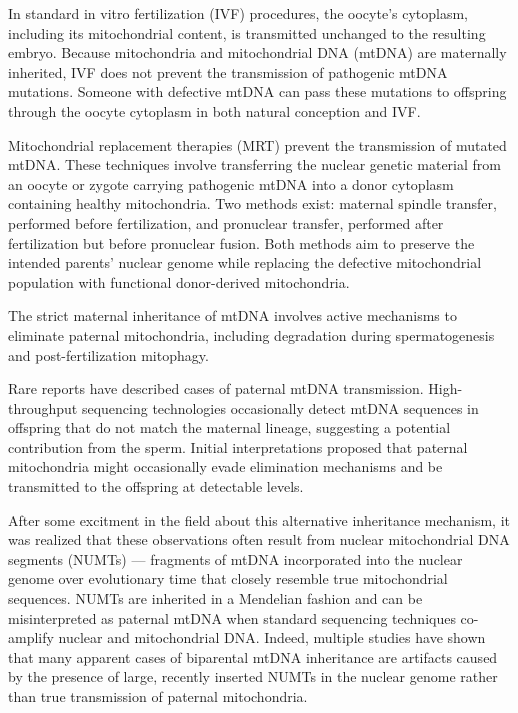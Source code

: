 In standard in vitro fertilization (IVF) procedures, the oocyte’s cytoplasm, including its mitochondrial content, is transmitted unchanged to the resulting embryo. Because mitochondria and mitochondrial DNA (mtDNA) are maternally inherited, IVF does not prevent the transmission of pathogenic mtDNA mutations. Someone with defective mtDNA can pass these mutations to offspring through the oocyte cytoplasm in both natural conception and IVF.

Mitochondrial replacement therapies (MRT) prevent the transmission of mutated mtDNA. These techniques involve transferring the nuclear genetic material from an oocyte or zygote carrying pathogenic mtDNA into a donor cytoplasm containing healthy mitochondria. Two methods exist: maternal spindle transfer, performed before fertilization, and pronuclear transfer, performed after fertilization but before pronuclear fusion. Both methods aim to preserve the intended parents' nuclear genome while replacing the defective mitochondrial population with functional donor-derived mitochondria.

The strict maternal inheritance of mtDNA involves active mechanisms to eliminate paternal mitochondria, including degradation during spermatogenesis and post-fertilization mitophagy.

Rare reports have described cases of paternal mtDNA transmission. High-throughput sequencing technologies occasionally detect mtDNA sequences in offspring that do not match the maternal lineage, suggesting a potential contribution from the sperm. Initial interpretations proposed that paternal mitochondria might occasionally evade elimination mechanisms and be transmitted to the offspring at detectable levels.

After some excitment in the field about this alternative inheritance mechanism, it was realized that these observations often result from nuclear mitochondrial DNA segments (NUMTs) — fragments of mtDNA incorporated into the nuclear genome over evolutionary time that closely resemble true mitochondrial sequences. NUMTs are inherited in a Mendelian fashion and can be misinterpreted as paternal mtDNA when standard sequencing techniques co-amplify nuclear and mitochondrial DNA. Indeed, multiple studies have shown that many apparent cases of biparental mtDNA inheritance are artifacts caused by the presence of large, recently inserted NUMTs in the nuclear genome rather than true transmission of paternal mitochondria.


